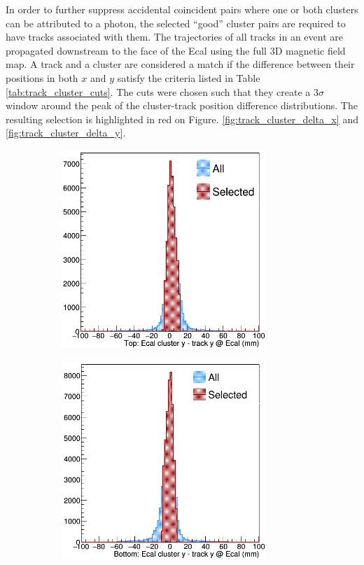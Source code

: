 In order to further suppress accidental coincident pairs where one or both
clusters can be attributed to a photon, the 
selected ``good'' cluster pairs are required to have tracks associated 
with them. The trajectories of all tracks in an event are propagated downstream
to the face of the Ecal using the full 3D magnetic field map.  A track and a cluster
are considered a match if the difference between their positions in both $x$ 
and $y$ satisfy the criteria listed in Table \ref{tab:track_cluster_cuts}. The 
cuts were chosen such that they create a 3$\sigma$ window around the peak of 
the cluster-track position difference distributions. The resulting selection is 
highlighted in red on 
Figure. \ref{fig:track_cluster_delta_x} and \ref{fig:track_cluster_delta_y}.
\begin{figure}[h]
    \begin{subfigure}{.5\textwidth}
        \centering
        \includegraphics[width=0.85\textwidth]{images/20160502_pass4_cluster_track_delta_y_top.png}
    \end{subfigure}
    \begin{subfigure}{.5\textwidth}
        \centering
        \includegraphics[width=0.85\textwidth]{images/20160502_pass4_cluster_track_delta_y_bottom.png}

\end{subfigure}
\end{figure}
